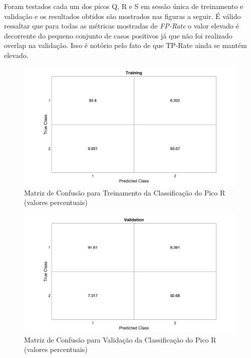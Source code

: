 \documentclass{article}
\begin{document}
Foram testados cada um dos picos Q, R e S em sessão única de treinamento e validação e os resultados obtidos são mostrados nas figuras a seguir. É válido ressaltar que para todas as métricas mostradas de \textit{FP-Rate} o valor elevado é decorrente do pequeno conjunto de casos positivos já que não foi realizado overlap na validação. Isso é notório pelo fato de que TP-Rate ainda se mantém elevado.

\begin{figure}[H]
	\begin{center}
		\includegraphics[scale=0.19]{../SVM_train.png}
		\caption{Matriz de Confusão para Treinamento da Classificação do Pico R (valores percentuais)}
		\label{fig:SVM_train}
	\end{center}
\end{figure}  


\begin{figure}[H]
	\begin{center}
		\includegraphics[scale=0.19]{../SVM_val.png}
		\caption{Matriz de Confusão para Validação da Classificação do Pico R (valores percentuais)}
		\label{fig:SVM_val}
	\end{center}
\end{figure}  
\end{document}
